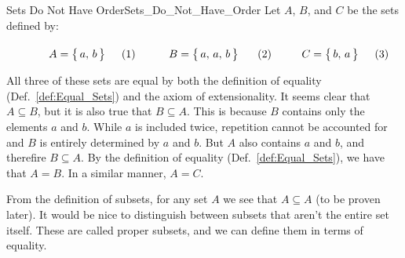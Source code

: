         \begin{fexample}{Sets Do Not Have Order}{Sets_Do_Not_Have_Order}
            Let $A$, $B$, and $C$ be the sets defined by:
            \par
            \begin{subequations}
                \begin{minipage}[b]{0.31\textwidth}
                    \begin{equation}
                        A=\big\{\,a,\,b\,\big\}
                    \end{equation}
                \end{minipage}
                \hfill
                \begin{minipage}[b]{0.36\textwidth}
                    \begin{equation}
                        B=\big\{\,a,\,a,\,b\,\big\}
                    \end{equation}
                \end{minipage}
                \hfill
                \begin{minipage}[b]{0.31\textwidth}
                    \begin{equation}
                        C=\big\{\,b,\,a\,\big\}
                    \end{equation}
                \end{minipage}
            \end{subequations}
            \par\vspace{2.5ex}
            All three of these sets are equal by both the definition of equality
            (Def.~\ref{def:Equal_Sets}) and the axiom of extensionality. It
            seems clear that $A\subseteq{B}$, but it is also true that
            $B\subseteq{A}$. This is because $B$ contains only the elements $a$
            and $b$. While $a$ is included twice, repetition cannot be accounted
            for and $B$ is entirely determined by $a$ and $b$. But $A$ also
            contains $a$ and $b$, and therefire $B\subseteq{A}$. By the
            definition of equality (Def.~\ref{def:Equal_Sets}), we have that
            $A=B$. In a similar manner, $A=C$.
        \end{fexample}
        From the definition of subsets, for any set $A$ we see that
        $A\subseteq{A}$ (to be proven later). It would be nice to distinguish
        between subsets that aren't the entire set itself. These are called
        proper subsets, and we can define them in terms of equality.

